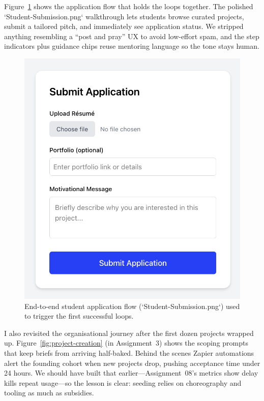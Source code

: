 Figure~\ref{fig:application-flow} shows the application flow that holds the loops together. The polished `Student-Submission.png` walkthrough lets students browse curated projects, submit a tailored pitch, and immediately see application status. We stripped anything resembling a ``post and pray'' UX to avoid low-effort spam, and the step indicators plus guidance chips reuse mentoring language so the tone stays human.

\begin{figure}[h]
  \centering
  \includegraphics[width=0.85\linewidth]{figures/Student-Submission.png}
  \caption{End-to-end student application flow (`Student-Submission.png`) used to trigger the first successful loops.}
  \label{fig:application-flow}
\end{figure}

I also revisited the organisational journey after the first dozen projects wrapped up. Figure~\ref{fig:project-creation} (in Assignment~3) shows the scoping prompts that keep briefs from arriving half-baked. Behind the scenes Zapier automations alert the founding cohort when new projects drop, pushing acceptance time under 24 hours. We should have built that earlier---Assignment~08's metrics show delay kills repeat usage---so the lesson is clear: seeding relies on choreography and tooling as much as subsidies.
